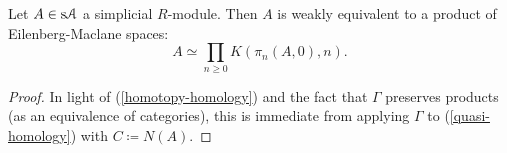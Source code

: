 \begin{proposition}
  Let $A \in \mathrm{s}\mathcal{A}$ a simplicial $R$-module. Then $A$ is weakly
  equivalent to a product of Eilenberg-Maclane spaces:
  \[
  A \simeq \prod_{n \ge 0} K(\pi_n(A,0),n).
  \]
\end{proposition}

\begin{proof}
  In light of (\ref{homotopy-homology}) and the fact that $\Gamma$
  preserves products (as an equivalence of categories), this is
  immediate from applying $\Gamma$ to (\ref{quasi-homology}) with $C
  \coloneqq N(A)$.
\end{proof}


\nocite{goerssjardine, riehl-ssets, mathew-doldkan, weibel}




